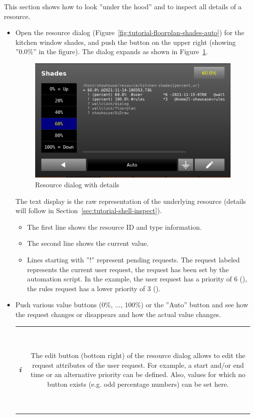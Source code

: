 \documentclass[12pt,english,parskip=half,headheight=19pt]{scrreprt}
\newcommand{\lst}[1]{\colorbox{lstbackground}{\footnotesize\code{#1}}}
\newcommand{\infobox}[1]{
  \par
  \medskip
  \hfill
  \setlength\arrayrulewidth{1pt}
  \begin{tabular}[t]{c|c|}
    \parbox{1.8em}{\hfill\textit{\Huge\textbf{i}\,}}
    &
    \,\parbox{0.89\linewidth}{\setlength{\parskip}{0.5em} \small #1}\,
  \end{tabular}
  \medskip
  \par
}
\begin{document}
This section shows how to look ''under the hood'' and to inspect all details of a resource.

\begin{itemize}[$\blacktriangleright$]

  \item
    Open the resource dialog (Figure~\ref{fig:tutorial-floorplan-shades-auto}) for the kitchen window shades,
    and push the button on the upper right (showing ''0.0\%'' in the figure). The dialog expands as
    shown in Figure~\ref{fig:tutorial-floorplan-shades-details}.

    \begin{figure}[ht]
      \centering
      \includegraphics[width=0.7\linewidth]{figs/wallclock-floorplan-shades-details.png}
      \caption[l]{Resource dialog with details}
      \label{fig:tutorial-floorplan-shades-details}
    \end{figure}

    The text display is the raw representation of the underlying resource (details will follow in
    Section~\ref{sec:tutorial-shell-inspect}).
    \begin{itemize}
      \item The first line shows the resource ID and type information.
      \item The second line shows the current value.
      \item Lines starting with ''!'' represent pending requests. The request labeled \lst{#user}
        represents the current user request, the request \lst{#rules} has been set by the
        automation script. In the example, the user request has a priority of 6 (\lst{*6}), the
        rules request has a lower priority of 3 (\lst{*3}).
    \end{itemize}

  \item
    Push various value buttons (0\%, ..., 100\%) or the ''Auto'' button and see how
    the \lst{#user} request changes or disappears and how the actual value changes.
    \infobox{
      The edit button (bottom right) of the resource dialog allows to edit the request attributes
      of the user request. For example, a start and/or end time or an alternative priority can be defined.
      Also, values for which no button exists (e.g. odd percentage numbers) can be set here.

}
\end{itemize}
\end{document}
